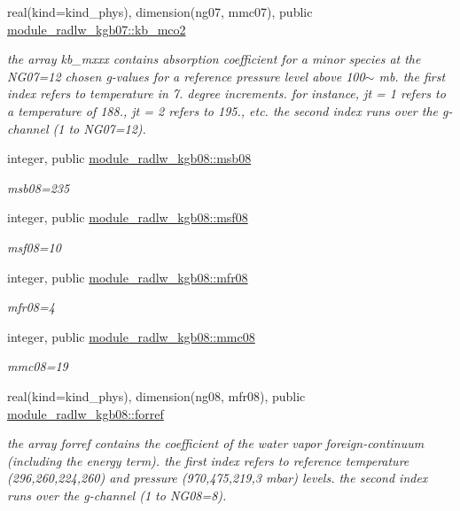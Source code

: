 \begin{Indent}
\begin{DoxyCompactItemize}
real(kind=kind\+\_\+phys), dimension(ng07, mmc07), public \hyperlink{group__module__radlw__kgbnn_ga2dcfbe76332d559cda48c7ba065ab349}{module\+\_\+radlw\+\_\+kgb07\+::kb\+\_\+mco2}
\begin{DoxyCompactList}\small\item\em the array kb\+\_\+mxxx contains absorption coefficient for a minor species at the N\+G07=12 chosen g-\/values for a reference pressure level above 100$\sim$ mb. the first index refers to temperature in 7. degree increments. for instance, jt = 1 refers to a temperature of 188., jt = 2 refers to 195., etc. the second index runs over the g-\/channel (1 to N\+G07=12). \end{DoxyCompactList}\item 
integer, public \hyperlink{group__module__radlw__kgbnn_ga3dd391fcce47d3aca3512bbfd946807b}{module\+\_\+radlw\+\_\+kgb08\+::msb08}
\begin{DoxyCompactList}\small\item\em msb08=235 \end{DoxyCompactList}\item 
integer, public \hyperlink{group__module__radlw__kgbnn_ga7db22d5a0ece1b1f10cbf64ae1181a09}{module\+\_\+radlw\+\_\+kgb08\+::msf08}
\begin{DoxyCompactList}\small\item\em msf08=10 \end{DoxyCompactList}\item 
integer, public \hyperlink{group__module__radlw__kgbnn_gabfaf0cad62f8ae42564f8127198d48f0}{module\+\_\+radlw\+\_\+kgb08\+::mfr08}
\begin{DoxyCompactList}\small\item\em mfr08=4 \end{DoxyCompactList}\item 
integer, public \hyperlink{group__module__radlw__kgbnn_ga9e3bfc1880221c18fa07817eb62bcc47}{module\+\_\+radlw\+\_\+kgb08\+::mmc08}
\begin{DoxyCompactList}\small\item\em mmc08=19 \end{DoxyCompactList}\item 
real(kind=kind\+\_\+phys), dimension(ng08, mfr08), public \hyperlink{group__module__radlw__kgbnn_ga8427ec5170f6a61a008a8580be6fe5ec}{module\+\_\+radlw\+\_\+kgb08\+::forref}
\begin{DoxyCompactList}\small\item\em the array forref contains the coefficient of the water vapor foreign-\/continuum (including the energy term). the first index refers to reference temperature (296,260,224,260) and pressure (970,475,219,3 mbar) levels. the second index runs over the g-\/channel (1 to N\+G08=8). \end{DoxyCompactList}\item 

\end{DoxyCompactItemize}
\end{Indent}
